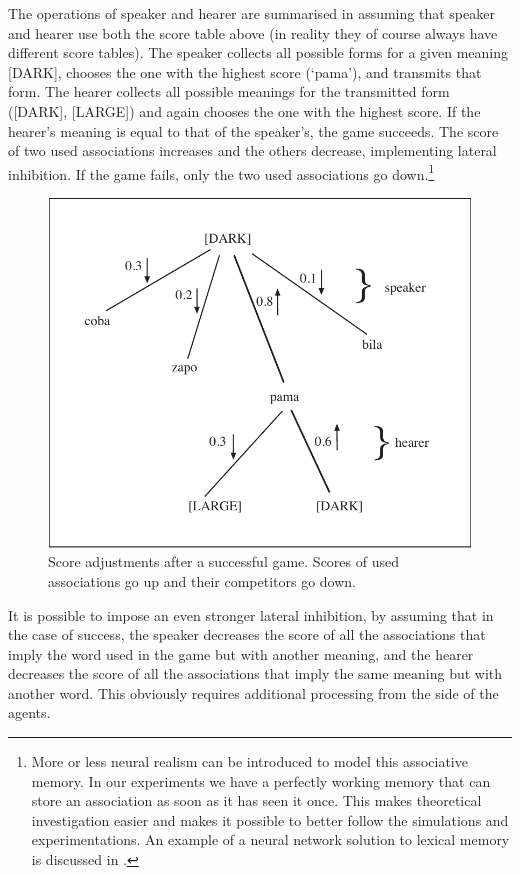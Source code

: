 The operations of speaker and hearer are summarised in 
 assuming that speaker and hearer
use both the score table above (in reality they of 
course always have different score tables). 
The speaker collects all possible
forms for a given meaning [DARK], chooses the one with the
highest score (`pama'), and transmits that form. 
The hearer collects all possible meanings for 
the transmitted form ([DARK], [LARGE]) and again chooses the one with
the highest score. If the hearer's meaning is equal to that
of the speaker's, the game succeeds. The score of 
two used associations increases and the others
decrease, implementing lateral 
inhibition. If the game fails, only the two used associations 
go down.\footnote{More or less neural realism can be introduced to 
model this associative memory. In our experiments we 
have a perfectly working memory that can store an 
association as soon as it has seen it once. This makes
theoretical investigation easier and makes it possible
to better follow the simulations and experimentations.  
An example of a neural network solution to lexical
memory is discussed in \cite{Cangelosi:1996}.}


\begin{figure}[htbp]
  \centerline{\includegraphics[width=.60\textwidth]{chap5/figs/incr-decr.pdf}}
\caption{\label{incr-decr} 
Score adjustments after a successful game. Scores of used 
associations go up and their competitors go down.}
\end{figure}

It is possible to impose an even stronger
lateral inhibition, by assuming that in the case of 
success, the speaker decreases the score of 
all the associations that imply the word used in 
the game but with another meaning, and the 
hearer decreases the score of all the associations
that imply the same meaning but with another 
word. This obviously requires additional processing
from the side of the agents. 

